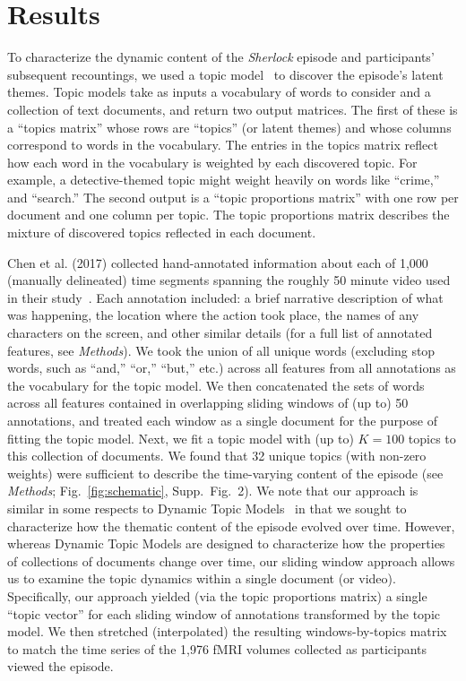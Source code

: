 \documentclass[10pt]{article}
\newcommand{\topics}{2}
\begin{document}
\section*{Results}
To characterize the dynamic content of the \textit{Sherlock} episode and participants' subsequent recountings, we used a topic model~\citep{BleiEtal03} to discover the episode's latent themes.  Topic models take as inputs a vocabulary of words to consider and a collection of text documents, and return two output matrices.  The first of these is a ``topics matrix'' whose rows are ``topics'' (or latent themes) and whose columns correspond to words in the vocabulary. The entries in the topics matrix reflect how each word in the vocabulary is weighted by each discovered topic.  For example, a detective-themed topic might weight heavily on words like ``crime,'' and ``search.''  The second output is a ``topic proportions matrix'' with one row per document and one column per topic.  The topic proportions matrix describes the mixture of discovered topics reflected in each document.

Chen et al. (2017) collected hand-annotated information about each of 1,000 (manually delineated) time segments spanning the roughly 50 minute video used in their study~\cite{ChenEtal17}.  Each annotation included: a brief narrative description of what was happening, the location where the action took place, the names of any characters on the screen, and other similar details (for a full list of annotated features, see \textit{Methods}).  We took the union of all unique words (excluding stop words, such as ``and,'' ``or,'' ``but,'' etc.) across all features from all annotations as the vocabulary for the topic model.  We then concatenated the sets of words across all features contained in overlapping sliding windows of (up to) 50 annotations, and treated each window as a single document for the purpose of fitting the topic model.  Next, we fit a topic model with (up to) $K = 100$ topics to this collection of documents.  We found that 32 unique topics (with non-zero weights) were sufficient to describe the time-varying content of the episode (see \textit{Methods}; Fig.~\ref{fig:schematic}, Supp.\ Fig.~\topics).  We note that our approach is similar in some respects to Dynamic Topic Models~\citep{BleiLaff06} in that we sought to characterize how the thematic content of the episode evolved over time.  However, whereas Dynamic Topic Models are designed to characterize how the properties of collections of documents change over time, our sliding window approach allows us to examine the topic dynamics within a single document (or video).  Specifically, our approach yielded (via the topic proportions matrix) a single ``topic vector'' for each sliding window of annotations transformed by the topic model.  We then stretched (interpolated) the resulting windows-by-topics matrix to match the time series of the 1,976 fMRI volumes collected as participants viewed the episode.
\end{document}
